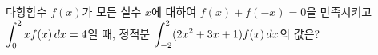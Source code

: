 다항함수 $f(x)$가 모든 실수 $x$에 대하여 $f(x)+f(-x)=0$을 만족시키고 $\displaystyle\int_{0}^{2}xf(x)\mkern3mu dx=4$일 때, 정적분 $\displaystyle\int_{-2}^{2}(2x^2+3x+1)f(x)\mkern3mu dx$의 값은?
